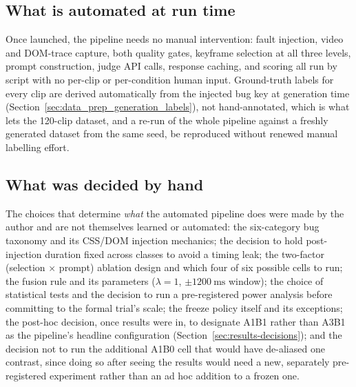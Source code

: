 \subsection{What is automated at run time}
Once launched, the pipeline needs no manual intervention: fault injection, video and DOM-trace capture, both quality gates, keyframe selection at all three levels, prompt construction, judge API calls, response caching, and scoring all run by script with no per-clip or per-condition human input. Ground-truth labels for every clip are derived automatically from the injected bug key at generation time (Section~\ref{sec:data_prep_generation_labels}), not hand-annotated, which is what lets the 120-clip dataset, and a re-run of the whole pipeline against a freshly generated dataset from the same seed, be reproduced without renewed manual labelling effort.
\label{sec:data_prep_generation_labels}

\subsection{What was decided by hand}
The choices that determine \emph{what} the automated pipeline does were made by the author and are not themselves learned or automated: the six-category bug taxonomy and its CSS/DOM injection mechanics; the decision to hold post-injection duration fixed across classes to avoid a timing leak; the two-factor (selection $\times$ prompt) ablation design and which four of six possible cells to run; the fusion rule and its parameters ($\lambda=1$, $\pm\SI{1200}{\milli\second}$ window); the choice of statistical tests and the decision to run a pre-registered power analysis before committing to the formal trial's scale; the freeze policy itself and its exceptions; the post-hoc decision, once results were in, to designate A1B1 rather than A3B1 as the pipeline's headline configuration (Section~\ref{sec:results-decisions}); and the decision not to run the additional A1B0 cell that would have de-aliased one contrast, since doing so after seeing the results would need a new, separately pre-registered experiment rather than an ad hoc addition to a frozen one.

